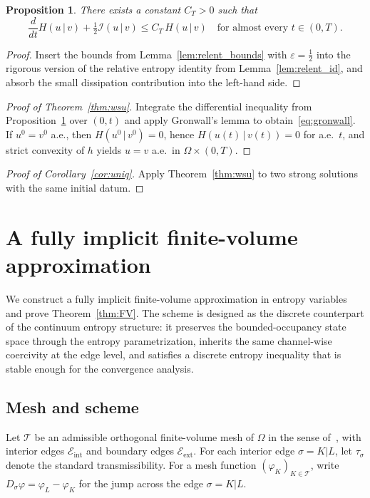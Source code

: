 \documentclass{article}
\newtheorem{proposition}[theorem]{Proposition}
\begin{document}
\begin{proposition}\label{prop:relent_gronwall}
There exists a constant $C_T>0$ such that
\[
  \frac{d}{dt}H(u\,|\,v)
  + \tfrac{1}{2}\mathcal{I}(u\,|\,v)
  \le C_T\,H(u\,|\,v)
  \quad\text{for almost every }t\in(0,T).
\]
\end{proposition}

\begin{proof}
Insert the bounds from Lemma~\ref{lem:relent_bounds} with $\varepsilon=\tfrac{1}{2}$
into the rigorous version of the relative entropy identity from
Lemma~\ref{lem:relent_id}, and absorb the small dissipation contribution
into the left-hand side.
\end{proof}

\begin{proof}[Proof of Theorem~\ref{thm:wsu}]
Integrate the differential inequality from Proposition~\ref{prop:relent_gronwall}
over $(0,t)$ and apply Gronwall's lemma to obtain~\eqref{eq:gronwall}.
If $u^0=v^0$ a.e., then $H(u^0\,|\,v^0)=0$, hence $H(u(t)\,|\,v(t))=0$
for a.e.\ $t$, and strict convexity of $h$ yields $u=v$ a.e.\ in
$\Omega\times(0,T)$.
\end{proof}

\begin{proof}[Proof of Corollary~\ref{cor:uniq}]
Apply Theorem~\ref{thm:wsu} to two strong solutions with the same
initial datum.
\end{proof}

\section{A fully implicit finite-volume approximation}
\label{sec:FV}

We construct a fully implicit finite-volume approximation in entropy
variables and prove Theorem~\ref{thm:FV}. The scheme is designed as the
discrete counterpart of the continuum entropy structure: it preserves the
bounded-occupancy state space through the entropy parametrization,
inherits the same channel-wise coercivity at the edge level, and
satisfies a discrete entropy inequality that is stable enough for the
convergence analysis.

\subsection{Mesh and scheme}

Let $\mathcal{T}$ be an admissible orthogonal finite-volume mesh of
$\Omega$ in the sense of~\cite{Eymard2000}, with interior edges
$\mathcal{E}_{\mathrm{int}}$ and boundary edges $\mathcal{E}_{\mathrm{ext}}$.
For each interior edge $\sigma=K|L$, let $\tau_\sigma$ denote the
standard transmissibility. For a mesh function $(\varphi_K)_{K\in\mathcal{T}}$,
write $D_\sigma\varphi = \varphi_L-\varphi_K$ for the jump across the
edge $\sigma=K|L$.
\end{document}
